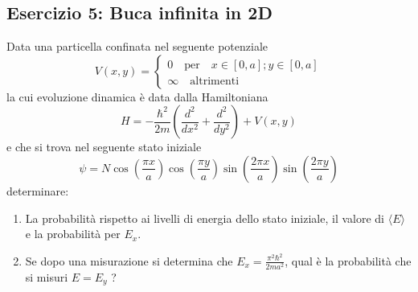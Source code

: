 \subsection{Esercizio 5: Buca infinita in 2D}

Data una particella confinata nel  seguente potenziale 
\begin{equation*}
	V(x,y) = \left \{ \begin{array}{l}
		0 \quad \text{per} \quad x \in [0,a]; y \in [0,a]\\[0.3cm]
		\infty \quad \text{altrimenti}
	\end{array}\right.
\end{equation*}
la cui evoluzione dinamica \`e data dalla Hamiltoniana 
\begin{equation*}
	H = - \frac{\hbar^2}{2m} \left (\frac{d^2}{dx^2} +\frac{d^2}{dy^2}\right) + V(x,y)  
\end{equation*}
\newpage
e che si trova nel seguente stato iniziale 
\begin{equation*}
	\psi = N \cos \left( \frac{\pi x}{a}\right) \cos\left( \frac{\pi y}{a}\right) \sin \left( \frac{2 \pi x}{a}\right)\sin \left( \frac{2 \pi y}{a}\right)
\end{equation*}
determinare: 
\begin{enumerate}
	\item La probabilit\`a rispetto ai livelli di energia dello stato iniziale, il valore di $\langle E \rangle $ e la probabilit\`a per $E_x$.
	\item Se dopo una misurazione si determina che $E_x = \frac{\pi^2 \hbar^2}{2ma^2}$, qual \`e la probabilit\`a che si misuri $E = E_y$ ? 
\end{enumerate}


